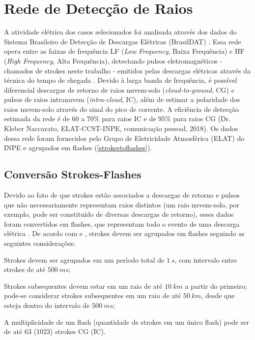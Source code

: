 \newpage

\section{Rede de Detecção de Raios}\label{raios}

A atividade elétrica dos casos selecionados foi analisada através dos dados do Sistema Brasileiro de Detecção de Descargas Elétricas (BrasilDAT) \cite{Naccarato2014}. Essa rede opera entre as faixas de frequência LF (\textit{Low Frequency}, Baixa Frequência) e HF (\textit{High Frequency}, Alta Frequência), detectando pulsos eletromagnéticos - chamados de strokes neste trabalho - emitidos pelas descargas elétricas através da técnica do tempo de chegada \cite{Lewis1960}. Devido à larga banda de frequência, é possível diferencial descargas de retorno de raios nuvem-solo (\textit{cloud-to-ground}, CG) e pulsos de raios intranuvem (\textit{intra-cloud}, IC), além de estimar a polaridade dos raios nuvem-solo através do sinal do pico de corrente. A eficiência de detecção estimada da rede é de $60$ a $70\%$ para raios IC e de $95\%$ para raios CG (Dr. Kleber Naccarato, ELAT-CCST-INPE, comunicação pessoal, 2018). Os dados dessa rede foram fornecidos pelo Grupo de Eletricidade Atmosférica (ELAT) do INPE e agrupados em flashes (\autoref{strokestoflashes}).

\subsection{Conversão Strokes-Flashes}\label{strokestoflashes}

Devido ao fato de que strokes estão associados a descargas de retorno e pulsos que não necessariamente representam raios distintos (um raio nuvem-solo, por exemplo, pode ser constituído de diversas descargas de retorno), esses dados foram convertidos em flashes, que representam todo o evento de uma descarga elétrica \cite{MacGorman1998b}. De acordo com  e , strokes devem ser agrupados em flashes seguindo as seguintes considerações:

\begin{alineas}
	\item Strokes devem ser agrupados em um período total de $1\:s$, com intervalo entre strokes de até $500\:ms$;
	\item Strokes subsequentes devem estar em um raio de até $10\:km$ a partir do primeiro; pode-se considerar strokes subsequentes em um raio de até $50\:km$, desde que esteja dentro do intervalo de $500\:ms$;
	\item A multiplicidade de um flash (quantidade de strokes em um único flash) pode ser de até 63 (1023) strokes CG (IC).
\end{alineas} 

